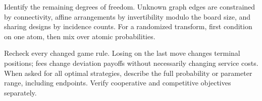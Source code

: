 Identify the remaining degrees of freedom. Unknown graph edges are constrained by connectivity, affine arrangements by invertibility modulo the board size, and sharing designs by incidence counts. For a randomized transform, first condition on one atom, then mix over atomic probabilities.

Recheck every changed game rule. Losing on the last move changes terminal positions; fees change deviation payoffs without necessarily changing service costs. When asked for all optimal strategies, describe the full probability or parameter range, including endpoints. Verify cooperative and competitive objectives separately.
\par\smallskip
